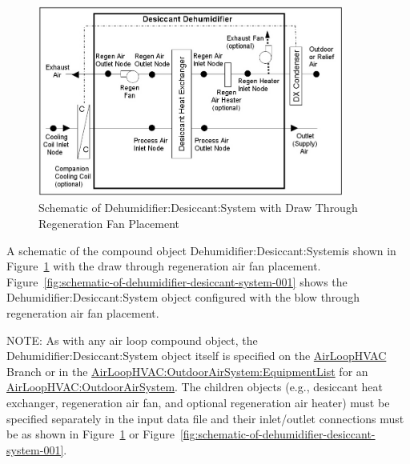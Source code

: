 \begin{figure}[hbtp] %
\centering
\includegraphics[width=0.9\textwidth, height=0.9\textheight, keepaspectratio=true]{media/image409.png}
\caption{Schematic of Dehumidifier:Desiccant:System with Draw Through Regeneration Fan Placement \protect \label{fig:schematic-of-dehumidifier-desiccant-system}}
\end{figure}

A schematic of the compound object Dehumidifier:Desiccant:Systemis shown in Figure~\ref{fig:schematic-of-dehumidifier-desiccant-system} with the draw through regeneration air fan placement. Figure~\ref{fig:schematic-of-dehumidifier-desiccant-system-001} shows the Dehumidifier:Desiccant:System object configured with the blow through regeneration air fan placement.

NOTE: As with any air loop compound object, the Dehumidifier:Desiccant:System object itself is specified on the \hyperref[airloophvac]{AirLoopHVAC} Branch or in the \hyperref[airloophvacoutdoorairsystemequipmentlist]{AirLoopHVAC:OutdoorAirSystem:EquipmentList} for an \hyperref[airloophvacoutdoorairsystem]{AirLoopHVAC:OutdoorAirSystem}. The children objects (e.g., desiccant heat exchanger, regeneration air fan, and optional regeneration air heater) must be specified separately in the input data file and their inlet/outlet connections must be as shown in Figure~\ref{fig:schematic-of-dehumidifier-desiccant-system} or Figure~\ref{fig:schematic-of-dehumidifier-desiccant-system-001}.

